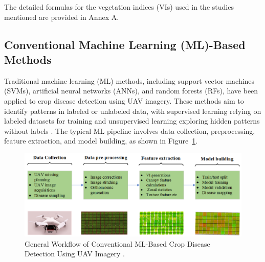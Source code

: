 The detailed formulas for the vegetation indices (VIs) used in the studies mentioned are provided in Annex A.
\begin{table}[h]
    \centering
    \caption{Summary of ST-based methods for Wheat disease estimation using UAV imagery.}
    \label{tab:summary}
    \end{table}


\subsection{Conventional Machine Learning (ML)-Based Methods}
Traditional machine learning (ML) methods, including support vector machines (SVMs), artificial neural networks (ANNs), and random forests (RFs), have been applied to crop disease detection using UAV imagery. These methods aim to identify patterns in labeled or unlabeled data, with supervised learning relying on labeled datasets for training and unsupervised learning exploring hidden patterns without labels \parencite{shahi2023recent}. The typical ML pipeline involves data collection, preprocessing, feature extraction, and model building, as shown in Figure~\ref{fig:MLBased}.

\begin{figure}[H]
    \centering
    \includegraphics[width=0.8
    \textwidth]{chapters/chapter3/images/Figure08.png}
    \caption{General Workflow of Conventional ML-Based Crop Disease Detection Using UAV Imagery \parencite{shahi2023recent}.}
    \label{fig:MLBased}
\end{figure}


